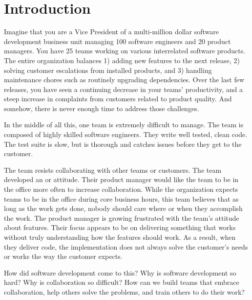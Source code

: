 
\chapter{Introduction}
\label{IntroductionChapter}

Imagine that you are a Vice President of a multi-million dollar software development business unit managing 100 software engineers and 20 product managers. You have 25 teams working on various interrelated software products. The entire organization balances 1) adding new features to the next release, 2) solving customer escalations from installed products, and 3) handling maintenance chores such as routinely upgrading dependencies. Over the last few releases, you have seen a continuing decrease in your teams' productivity, and a steep increase in complaints from customers related to product quality. And somehow, there is never enough time to address those challenges.

In the middle of all this, one team is extremely difficult  to manage. The team is composed of highly skilled software engineers. They write well tested, clean code. The test suite is slow, but is thorough and catches issues before they get to the customer. 

The team resists collaborating with other teams or customers. The team developed an  or  attitude. Their product manager would like the team to be in the office more often to increase collaboration. While the organization expects teams to be in the office during core business hours, this team believes that as long as the work gets done, nobody should care where or when they accomplish the work. The product manager is growing frustrated with the team's attitude about features. Their focus appears to be on delivering something that works without truly understanding how the features should work. As a result, when they deliver code, the implementation does not always solve the customer's needs or works the way the customer expects. 

How did software development come to this? Why is software development so hard? Why is collaboration so difficult? How can we build teams that embrace collaboration, help others solve the problems, and train others to do their work?

